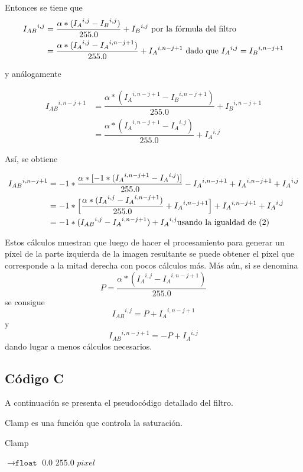 \par{Entonces se tiene que}
\begin{align}
{I_{AB}}^{i,j} &= \dfrac{\alpha * ( {I_{A}}^{i,j} - {I_{B}}^{i,j} )}{255.0} + {I_{B}}^{i,j} \textup{     por la fórmula del filtro} \nonumber \\
&= \dfrac{\alpha * ( {I_{A}}^{i,j} - {I_{A}}^{i,n - j + 1} )}{255.0} + {I_{A}}^{i,n - j + 1} \textup{    dado que } {I_{A}}^{i,j} = {I_{B}}^{i,n - j + 1}
\end{align}

y análogamente

\begin{align}
{I_{AB}}^{i,n - j + 1} &= \dfrac{\alpha * ( {I_{A}}^{i,n - j + 1} - {I_{B}}^{i,n - j +1} )}{255.0} + {I_{B}}^{i,n - j + 1}  \nonumber \\
&= \dfrac{\alpha * ( {I_{A}}^{i,n - j + 1} - {I_{A}}^{i,j} )}{255.0} + {I_{A}}^{i,j}
\end{align}

\par{Así, se obtiene}

\begin{align}
{I_{AB}}^{i,n - j + 1} &= -1 * \dfrac{\alpha * [-1 * ( {I_{A}}^{i,n - j + 1} - {I_{A}}^{i,j} )]}{255.0} - {I_{A}}^{i,n - j + 1} + {I_{A}}^{i,n - j + 1} + {I_{A}}^{i,j} \nonumber \\
&= -1 * \Big[ \dfrac{\alpha * ( {I_{A}}^{i,j} - {I_{A}}^{i,n - j + 1} )}{255.0} + {I_{A}}^{i,n - j + 1} \Big] + {I_{A}}^{i,n - j + 1} + {I_{A}}^{i,j} \nonumber \\
&= -1 * ( {I_{AB}}^{i,j} - {I_{A}}^{i,n - j + 1} ) + {I_{A}}^{i,j} \textup{usando la igualdad de (2)}
\end{align}

\par{Estos cálculos muestran que luego de hacer el procesamiento para generar un píxel de la parte izquierda de la imagen resultante se puede obtener el píxel que corresponde a la mitad derecha con pocos cálculos más. Más aún, si se denomina}
\[ P = \dfrac{\alpha * ( {I_{A}}^{i,j} - {I_{A}}^{i,n - j + 1} )}{255.0} \]
se consigue
\[ {I_{AB}}^{i,j} = P + {I_{A}}^{i,n - j + 1} \]
y
\[ {I_{AB}}^{i,n - j + 1} = -P + {I_{A}}^{i,j} \]
dando lugar a menos cálculos necesarios.

\subsection{Código C}
\par{A continuación se presenta el pseudocódigo detallado del filtro.}
\par{Clamp es una función que controla la saturación.}
\begin{algorithm}[h!]
\caption{Clamp}
\begin{algorithmic}
    $\to \texttt{float}$
		\State \Return $0.0$
	\Else
			\State \Return $255.0$
		\Else
			\State \Return $pixel$
		\EndIf
	\EndIf
\EndFunction
\end{algorithmic} 
\end{algorithm}

